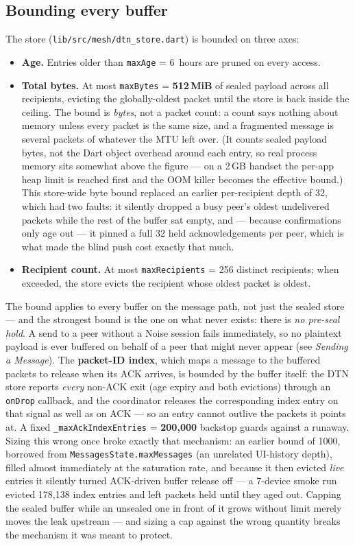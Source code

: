 \documentclass[11pt]{report}
\newcommand{\code}[1]{\texttt{\small #1}}
\begin{document}
\subsection*{Bounding every buffer}

The store (\code{lib/src/mesh/dtn\_store.dart}) is bounded on three axes:

\begin{itemize}
\item \textbf{Age.} Entries older than \code{maxAge} = 6~hours are pruned on every access.
\item \textbf{Total bytes.} At most \code{maxBytes} = \textbf{512\,MiB} of sealed payload across all recipients, evicting the globally-oldest packet until the store is back inside the ceiling. The bound is \emph{bytes}, not a packet count: a count says nothing about memory unless every packet is the same size, and a fragmented message is several packets of whatever the MTU left over. (It counts sealed payload bytes, not the Dart object overhead around each entry, so real process memory sits somewhat above the figure --- on a 2\,GB handset the per-app heap limit is reached first and the OOM killer becomes the effective bound.) This store-wide byte bound replaced an earlier per-recipient depth of 32, which had two faults: it silently dropped a busy peer's oldest undelivered packets while the rest of the buffer sat empty, and --- because confirmations only age out --- it pinned a full 32 held acknowledgements per peer, which is what made the blind push cost exactly that much.
\item \textbf{Recipient count.} At most \code{maxRecipients} = 256 distinct recipients; when exceeded, the store evicts the recipient whose oldest packet is oldest.
\end{itemize}

The bound applies to every buffer on the message path, not just the sealed store --- and the strongest bound is the one on what never exists: there is \emph{no pre-seal hold}. A send to a peer without a Noise session fails immediately, so no plaintext payload is ever buffered on behalf of a peer that might never appear (see \emph{Sending a Message}). The \textbf{packet-ID index}, which maps a message to the buffered packets to release when its ACK arrives, is bounded by the buffer itself: the DTN store reports \emph{every} non-ACK exit (age expiry and both evictions) through an \code{onDrop} callback, and the coordinator releases the corresponding index entry on that signal as well as on ACK --- so an entry cannot outlive the packets it points at. A fixed \code{\_maxAckIndexEntries} = \textbf{200{,}000} backstop guards against a runaway. Sizing this wrong once broke exactly that mechanism: an earlier bound of 1000, borrowed from \code{MessagesState.maxMessages} (an unrelated UI-history depth), filled almost immediately at the saturation rate, and because it then evicted \emph{live} entries it silently turned ACK-driven buffer release off --- a 7-device smoke run evicted 178{,}138 index entries and left packets held until they aged out. Capping the sealed buffer while an unsealed one in front of it grows without limit merely moves the leak upstream --- and sizing a cap against the wrong quantity breaks the mechanism it was meant to protect.
\end{document}
